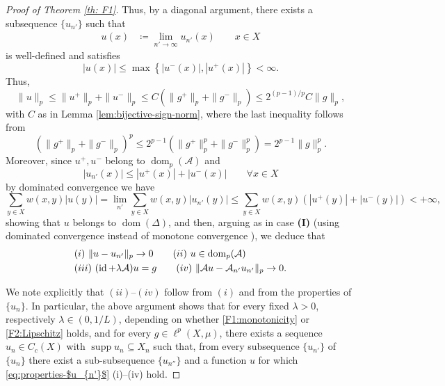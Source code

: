 \documentclass[journal]{article}
\theoremstyle{nonitalic}
\theoremstyle{nonitalic}
\theoremstyle{plain} %
\numberwithin{equation}{section}
\newcommand{\dom}{\operatorname{dom}}
\begin{document}
\begin{proof}[Proof of Theorem \ref{th: F1}]
Thus, by  a diagonal argument, there exists a  subsequence $\{u_{n'}\}$  such that 
\begin{align*}
	u(x)&\coloneqq \lim_{n'\to \infty} u_{n'}(x)\qquad x\in X
\end{align*}
 is well-defined and satisfies 
\begin{equation}\label{eq:uniform_bound2}
	|u(x)| \leq %
    \max\left\{|u^-(x)|, |u^+(x)|\right\}<\infty. 
\end{equation}
Thus,  
\[
\|u\|_p\leq \|u^+\|_p+\|u^-\|_p\leq 
C(\|g^+\|_p+\|g^-\|_p)
\leq 2^{(p-1)/p}C \|g\|_p,
\]
with $C$ as  in Lemma \ref{lem:bijective-sign-norm}, where the last  inequality follows from 
\[
(\|g^+\|_p + \|g^-\|_p)^p\leq 2^{p-1} (
\|g^+\|_p^p + \|g^-\|^p_p) = 2^{p-1} \|g\|^p_p.
\]
Moreover, since  $u^+,u^- $ 
 belong to $\dom_p(\mathcal{A})$ and 
\[
|u_{n'}(x)|\leq |u^+(x)|+|u^-(x)| \quad \quad \forall x \in X
\]
 by dominated convergence we have
\[
\sum_{y\in X} w(x,y)|u(y)|=\lim_{n'}\sum_{y\in X} w(x,y)|u_{n'}(y)|
\leq \sum_{y\in X} w(x,y) (|u^+(y)|+|u^-(y)|)<+\infty,
\] 
showing that $u$ belongs to $\dom(\Delta)$, and then, 
 arguing as in case \textnormal{\textbf{(I)}} (using dominated convergence instead of monotone convergence%
 ),
 we deduce that 
 \begin{equation}
 \begin{split}
\label{eq:properties-$u_{n'}$}
& (i) \,\, \|u-u_{n'}\|_p\to 0 \qquad (ii)\,\, u\in \dom_p(\mathcal{A}) \\
& (iii) \,\, (\operatorname{id} +\lambda \mathcal{A})u =g  \qquad (iv)\,\,  \|\mathcal{A}u- \mathcal{A}_{n'} u_{n'}\|_p\to 0.
\end{split}
\end{equation}
\par
We note explicitly that   $(ii)$--$(iv)$ follow from $(i)$ and from the properties of $\{u_n\}$.
In particular, the above argument shows that for every fixed 
$\lambda>0$, respectively  $\lambda\in(0,1/L)$, 
depending on whether \textnormal{\ref{F1:monotonicity}}  or  \textnormal{\ref{F2:Lipschitz}} holds, and for every $g\in\ell^p(X,\mu)$, there exists a sequence $u_n\in C_c(X)$ with $\operatorname{supp} u_n\subseteq X_n$ such that, from every subsequence $\{u_{n'}\}$ of $\{u_n\}$ there exist a  sub-subsequence  $\{u_{n''}\}$ and a function $u$ for which
\eqref{eq:properties-$u_{n'}$} (i)--(iv) hold.


\end{proof}
\end{document}
